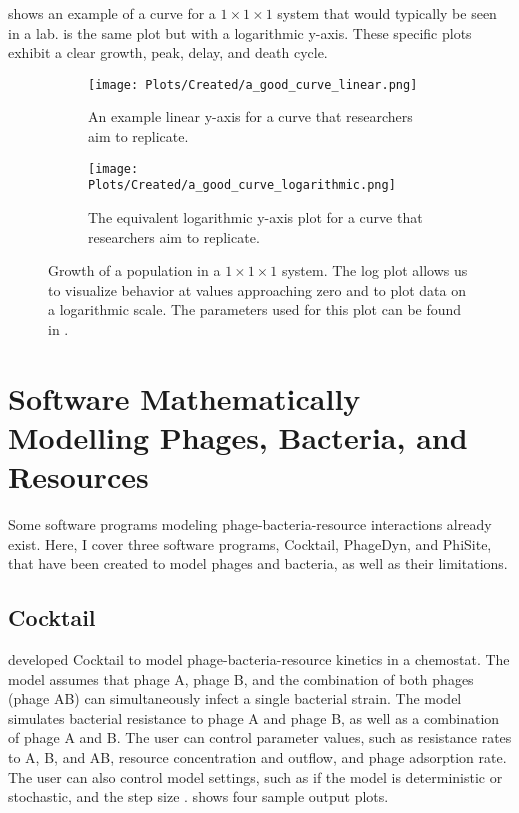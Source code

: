 shows an example of a curve for a $1\times1\times1$ system that would typically be seen in a lab. 
 is the same plot but with a logarithmic y-axis. 
These specific plots exhibit a clear growth, peak, delay, and death cycle. 

\begin{figure}[h!]
    \centering
    \begin{subfigure}{1\linewidth}
        \centering
        \captionsetup{width=1\linewidth}
        \texttt{[image: Plots/Created/a\_good\_curve\_linear.png]}
        \caption{
            An example linear y-axis for a curve that researchers aim to replicate. 
        }
        \label{fig:created:a_good_curve_linear}
    \end{subfigure}
    \hfill
    \begin{subfigure}{1\linewidth}
        \centering
        \captionsetup{width=1\linewidth}
        \texttt{[image: Plots/Created/a\_good\_curve\_logarithmic.png]}
        \caption{
            The equivalent logarithmic y-axis plot for a curve that researchers aim to replicate. 
        }
        \label{fig:created:a_good_curve_logarithmic}
    \end{subfigure}
    \caption{
        Growth of a population in a $1\times1\times1$ system. 
        The log plot allows us to visualize behavior at values approaching zero and to plot data on a logarithmic scale. 
        The parameters used for this plot can be found in . 
    }
    \label{fig:created:a_good_curve}
\end{figure}

\section{Software Mathematically Modelling Phages, Bacteria, and Resources}
Some software programs modeling phage-bacteria-resource interactions already exist. 
Here, I cover three software programs, Cocktail, PhageDyn, and PhiSite, that have been created to model phages and bacteria, as well as their limitations. 

\subsection{Cocktail}
\citet{nilssonCocktailComputerProgram2022} developed Cocktail to model phage-bacteria-resource kinetics in a chemostat. 
The model assumes that phage A, phage B, and the combination of both phages (phage AB) can simultaneously infect a single bacterial strain. 
The model simulates bacterial resistance to phage A and phage B, as well as a combination of phage A and B. 
The user can control parameter values, such as resistance rates to A, B, and AB, resource concentration and outflow, and phage adsorption rate. 
The user can also control model settings, such as if the model is deterministic or stochastic, and the step size \cite{nilssonCocktailComputerProgram2022}. 
 shows four sample output plots. 

